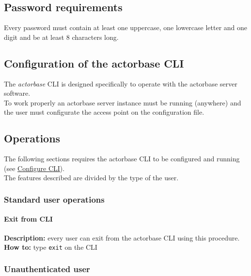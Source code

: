 \documentclass{scalatekids-article}
\begin{document}

\subsection{Password requirements}
\label{sec:passwordrequirement}
Every password must contain at least one uppercase, one lowercase letter and one
digit and be at least 8 characters long.

\subsection{Configuration of the actorbase CLI}
\label{sec:configurationcli}
The \textit{actorbase} CLI is designed specifically to operate
with the actorbase server software.\\
To work properly an actorbase server instance must be running
(anywhere) and the user must configurate the access point on the configuration file.

\subsection{Operations}

The following sections requires the actorbase CLI to be configured and
running (see \hyperref[sec:configurationcli]{Configure CLI}).\\
The features described are divided by the type of the user.

\subsubsection{Standard user operations}
\label{sec:everyuser}
\paragraph{Exit from CLI}

\textbf{Description:} every user can exit from the actorbase CLI
using this procedure.\\
\textbf{How to:} type \texttt{exit} on the CLI

\subsubsection{Unauthenticated user}
\label{sec:unauthenticateduser}
\end{document}

